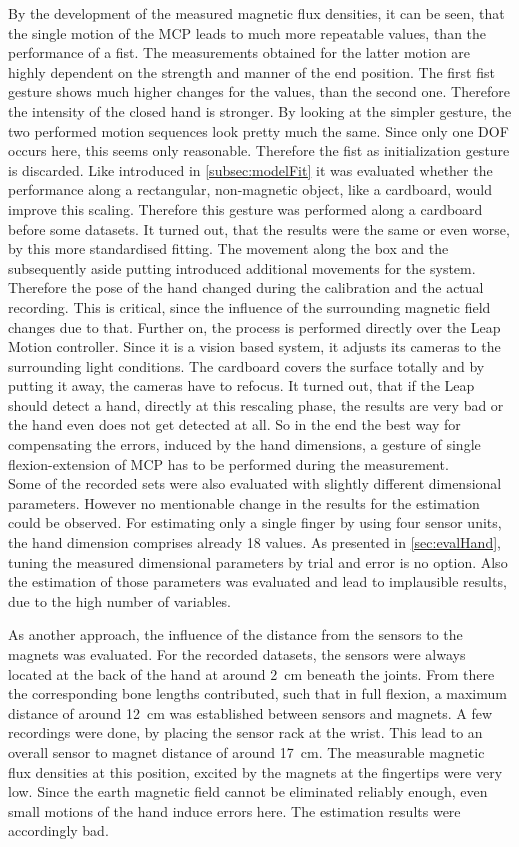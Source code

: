 By the development of the measured magnetic flux densities, it can be seen, that the single motion of the \ac{MCP} leads to much more repeatable values, than the performance of a fist. The measurements obtained for the latter motion are highly dependent on the strength and manner of the end position. The first fist gesture shows much higher changes for the values, than the second one. Therefore the intensity of the closed hand is stronger. By looking at the simpler gesture, the two performed motion sequences look pretty much the same. Since only one \ac{DOF} occurs here, this seems only reasonable. Therefore the fist as initialization gesture is discarded. Like introduced in \ref{subsec:modelFit} it was evaluated whether the performance along a rectangular, non-magnetic object, like a cardboard, would improve this scaling. Therefore this gesture was performed along a cardboard before some datasets. It turned out, that the results were the same or even worse, by this more standardised fitting. The movement along the box and the subsequently aside putting introduced additional movements for the system. Therefore the pose of the hand changed during the calibration and the actual recording. This is critical, since the influence of the surrounding magnetic field changes due to that. Further on, the process is performed directly over the Leap Motion controller. Since it is a vision based system, it adjusts its cameras to the surrounding light conditions. The cardboard covers the surface totally and by putting it away, the cameras have to refocus. It turned out, that if the Leap should detect a hand, directly at this rescaling phase, the results are very bad or the hand even does not get detected at all. So in the end the best way for compensating the errors, induced by the hand dimensions, a gesture of single flexion-extension of \ac{MCP} has to be performed during the measurement.\\
Some of the recorded sets were also evaluated with slightly different dimensional parameters. However no mentionable change in the results for the estimation could be observed. For estimating only a single finger by using four sensor units, the hand dimension comprises already 18 values. As presented in \ref{sec:evalHand}, tuning the measured dimensional parameters by trial and error is no option. Also the estimation of those parameters was evaluated and lead to implausible results, due to the high number of variables. 

As another approach, the influence of the distance from the sensors to the magnets was evaluated. For the recorded datasets, the sensors were always located at the back of the hand at around \SI{2}{\cm} beneath the joints. From there the corresponding bone lengths contributed, such that in full flexion, a maximum distance of around \SI{12}{\cm} was established between sensors and magnets. A few recordings were done, by placing the sensor rack at the wrist. This lead to an overall sensor to magnet distance of around \SI{17}{\cm}. The measurable magnetic flux densities at this position, excited by the magnets at the fingertips were very low. Since the earth magnetic field cannot be eliminated reliably enough, even small motions of the hand induce errors here. The estimation results were accordingly bad.

